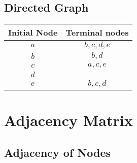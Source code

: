 \documentclass[12pt letter]{report}
\begin{document}
\subsection{Directed Graph}

\begin{table}[h!]
  \begin{center}
    \begin{tabular}{|c|c|}
      \hline
      Initial Node & Terminal nodes \\ [0.5ex]
      \hline
      \hline
      $a$          & $b, c,d, e$    \\
      $b$          & $b, d$         \\
      $c$          & $a, c, e$      \\
      $d$          &                \\
      $e$          & $b, c, d$      \\
      \hline
    \end{tabular}
  \end{center}
\end{table}

\section{Adjacency Matrix}


\subsection{Adjacency of Nodes}
\end{document}
